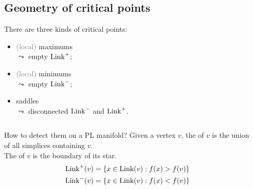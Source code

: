 \documentclass[10pt]{beamer}
\begin{document}
\subsection{Geometry of critical points}
\begin{frame*}
There are three kinds of critical points:
\begin{itemize}
\item \textcolor{gray}{(local)} maximums\\
$\leadsto$ empty $\operatorname{Link}^+$;
\item \textcolor{gray}{(local)} minimums\\
$\leadsto$ empty $\operatorname{Link}^-$;
\item saddles\\
$\leadsto$ disconnected $\operatorname{Link}^-$ and $\operatorname{Link}^+$.
\end{itemize}

\begin{columns}[T,onlytextwidth]
\begin{column}{.65\textwidth}
\begin{block}{How to detect them on a PL manifold?}
Given a vertex $v$, the  of $v$ is the union of all simplices containing $v$.\\
The  of $v$ is the boundary of its star.
\begin{align*}
\operatorname{Link}^+(v)&=\left\{x\in\operatorname{Link}(v):f(x)>f(v)\right\}\\
\operatorname{Link}^-(v)&=\left\{x\in\operatorname{Link}(v):f(x)<f(v)\right\}\\
\end{align*}
\end{block}
\end{column}
\begin{column}{.35\textwidth}
\end{column}
\end{columns}
\end{frame*}
\end{document}
